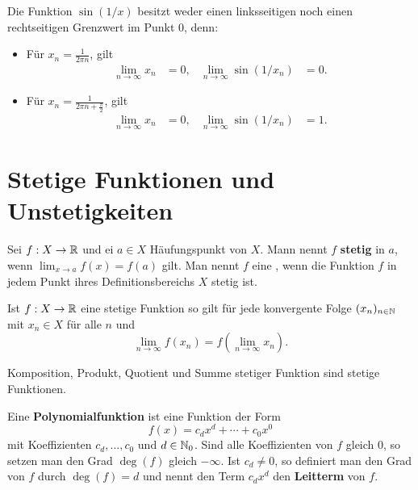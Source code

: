 \begin{bsp} 
	Die Funktion $\sin(1/x)$ besitzt weder einen linksseitigen noch einen rechtseitigen Grenzwert im Punkt $0$, denn:  
	
	\begin{itemize}
		\item[] Für $x_n = \frac{1}{2 \pi n}$, gilt 
		\begin{align*}
			\lim_{n \to \infty} x_n & = 0,  & \lim_{n \to \infty} \sin(1/x_n) & = 0.
		\end{align*}
		\item[] Für $x_n = \frac{1}{2 \pi n + \frac{\pi}{2}}$, gilt \begin{align*}
				\lim_{n \to \infty} x_n & = 0, & \lim_{n \to \infty} \sin(1/x_n) & = 1. 
		\end{align*}
	\end{itemize} 
\end{bsp} 


\section{Stetige Funktionen und Unstetigkeiten} 

\begin{defn}
	Sei $f : X \to \mathbb{R}$ und 
	ei $a \in X$ Häufungspunkt von $X$. Mann nennt $f$ \textbf{stetig} in $a$, wenn $\lim_{x \to a} f(x) = f(a)$ gilt. Man nennt $f$ eine , wenn die Funktion $f$ in jedem Punkt ihres Definitionsbereichs $X$ stetig ist. 
\end{defn} 

\begin{thm}
	Ist $f : X \to \mathbb{R}$ eine stetige Funktion so gilt für jede konvergente Folge $(x_n)_{n \in \mathbb{N}}$ mit $x_n \in X$ für alle $n$ und
	\[
		\lim_{n \to \infty} f(x_n) = f ( \lim_{n \to \infty} x_n). 
	\]
\end{thm} 

\begin{thm}
	Komposition, Produkt, Quotient und Summe stetiger Funktion sind stetige Funktionen. 
\end{thm} 

\begin{defn} 
	Eine \textbf{Polynomialfunktion} ist eine Funktion der Form 
	\[
	f(x) = c_d x^d + \cdots + c_0 x^0
	\] 
	mit Koeffizienten $c_d,\ldots,c_0$ und $d \in \mathbb{N}_0$. Sind alle Koeffizienten von $f$ gleich $0$, so setzen man den Grad $\deg(f)$ gleich $-\infty$. Ist $c_d \ne 0$, so definiert man den Grad von $f$ durch $\deg(f) = d$ und nennt den Term $c_d x^d$ den \textbf{Leitterm} von $f$. 
\end{defn} 


